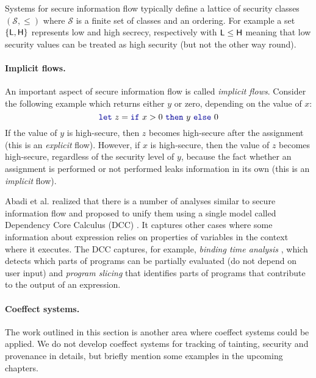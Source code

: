 Systems for secure information flow typically define a lattice of security classes $(\mathcal{S}, \leq)$
where $\mathcal{S}$ is a finite set of classes and an ordering. For example a set $\{\textnormal{\sffamily L}, \textnormal{\sffamily H}\}$ 
represents low and high secrecy, respectively with $\textnormal{\sffamily L} \leq \textnormal{\sffamily H}$ meaning that low security
values can be treated as high security (but not the other way round).

\paragraph{Implicit flows.}
An important aspect of secure information flow is called \emph{implicit flows}. Consider the following
example which returns either $y$ or zero, depending on the value of $x$:
%
\begin{equation*}
\kvd{let}~z = \kvd{if}~x>0~\kvd{then}~y~\kvd{else}~0
\end{equation*}
%
If the value of $y$ is high-secure, then $z$ becomes high-secure after the assignment
(this is an \emph{explicit} flow). However, if $x$ is high-secure, then the value of
$z$ becomes high-secure, regardless of the security level of $y$, because the fact whether an 
assignment is performed or not performed leaks information in its own (this is an 
\emph{implicit} flow).

Abadi et al. realized that there is a number of analyses similar to secure information flow
and proposed to unify them using a single model called Dependency Core Calculus (DCC) \cite{app-dcc}.
It captures other cases where some information about expression relies on properties of variables
in the context where it executes.  The DCC captures, for example, \emph{binding time analysis}
\cite{app-binding-time-analysis}, which detects which parts of programs can be partially evaluated
(do not depend on user input) and \emph{program slicing} \cite{app-slicing-survey} that identifies
parts of programs that contribute to the output of an expression.

\paragraph{Coeffect systems.}
The work outlined in this section is another area where coeffect systems could be applied.
We do not develop coeffect systems for tracking of tainting, security and provenance in details,
but briefly mention some examples in the upcoming chapters.

